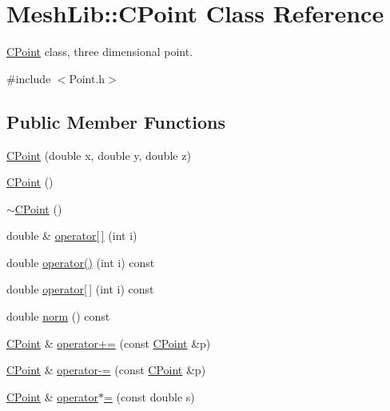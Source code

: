 \hypertarget{class_mesh_lib_1_1_c_point}{}\section{Mesh\+Lib\+:\+:C\+Point Class Reference}
\label{class_mesh_lib_1_1_c_point}


\hyperlink{class_mesh_lib_1_1_c_point}{C\+Point} class, three dimensional point.  




{\ttfamily \#include $<$Point.\+h$>$}

\subsection*{Public Member Functions}
\begin{DoxyCompactItemize}
\item 
\hyperlink{class_mesh_lib_1_1_c_point_afd9d24bcd526be02f303638615d92eaa}{C\+Point} (double x, double y, double z)
\item 
\hyperlink{class_mesh_lib_1_1_c_point_a58050a0f928a050c55b217b140cae020}{C\+Point} ()
\item 
\hyperlink{class_mesh_lib_1_1_c_point_acdee60ddbc7720703decda2852fd5bce}{$\sim$\+C\+Point} ()
\item 
double \& \hyperlink{class_mesh_lib_1_1_c_point_a6b35e4485ee7e7692a51bc4dc4b6d08b}{operator\mbox{[}$\,$\mbox{]}} (int i)
\item 
double \hyperlink{class_mesh_lib_1_1_c_point_a2f0ab3ed8c912a0d7fc54838437bdf1d}{operator()} (int i) const 
\item 
double \hyperlink{class_mesh_lib_1_1_c_point_aa47b93aa40b7b0877663cfbd21e3cd12}{operator\mbox{[}$\,$\mbox{]}} (int i) const 
\item 
double \hyperlink{class_mesh_lib_1_1_c_point_a90426ea8915a681f6aee9deae533b386}{norm} () const 
\item 
\hyperlink{class_mesh_lib_1_1_c_point}{C\+Point} \& \hyperlink{class_mesh_lib_1_1_c_point_aecb85b42cf883a67ee82f4477c45f410}{operator+=} (const \hyperlink{class_mesh_lib_1_1_c_point}{C\+Point} \&p)
\item 
\hyperlink{class_mesh_lib_1_1_c_point}{C\+Point} \& \hyperlink{class_mesh_lib_1_1_c_point_a5cf5a4600a7304fdc421d92b3b314aa0}{operator-\/=} (const \hyperlink{class_mesh_lib_1_1_c_point}{C\+Point} \&p)
\item 
\hyperlink{class_mesh_lib_1_1_c_point}{C\+Point} \& \hyperlink{class_mesh_lib_1_1_c_point_a6ca5c0227cabeb0ee008695ae4f3afec}{operator$\ast$=} (const double s)

\end{DoxyCompactItemize}
